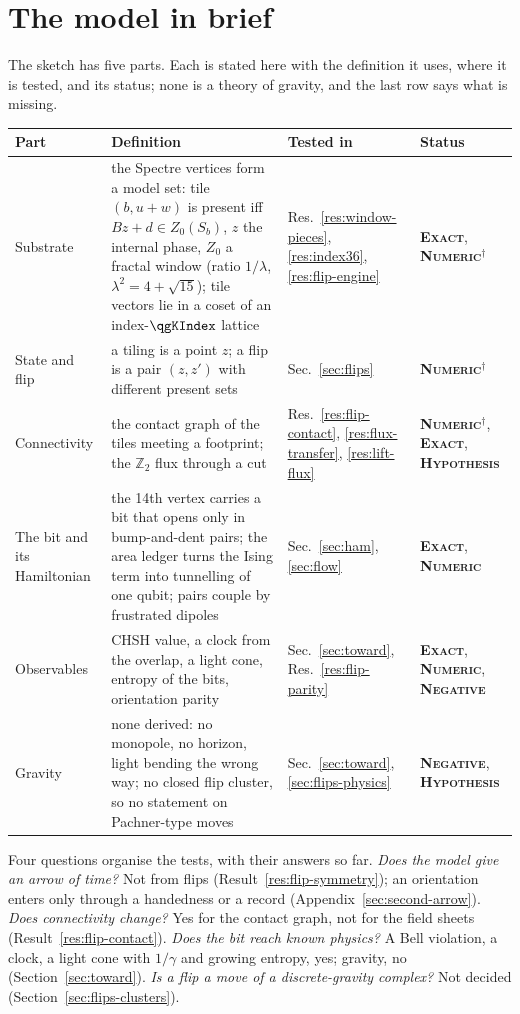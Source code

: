 \documentclass[11pt]{article}
\newcommand{\exact}{\textbf{\textsc{Exact}}}
\newcommand{\numeric}{\textbf{\textsc{Numeric}}}
\newcommand{\hypo}{\textbf{\textsc{Hypothesis}}}
\newcommand{\negres}{\textbf{\textsc{Negative}}}
\theoremstyle{definition}
\begin{document}
\section{The model in brief}\label{sec:model}
The sketch has five parts. Each is stated here with the definition it uses, where it is tested, and its status; none is a theory of gravity, and the last row says what is missing.
\begin{center}\footnotesize
\begin{tabular}{@{}p{22mm}p{62mm}p{22mm}p{28mm}@{}}
\toprule
Part & Definition & Tested in & Status \\ \midrule
Substrate & the Spectre vertices form a model set: tile $(b,u+w)$ is present iff $B z+d\in Z_0(S_b)$, $z$ the internal phase, $Z_0$ a fractal window (ratio $1/\lambda$, $\lambda^2=4+\sqrt{15}$); tile vectors lie in a coset of an index-$\qgKIndex$ lattice & Res.~\ref{res:window-pieces}, \ref{res:index36}, \ref{res:flip-engine} & \exact, \numeric$^\dagger$ \\
State and flip & a tiling is a point $z$; a flip is a pair $(z,z')$ with different present sets & Sec.~\ref{sec:flips} & \numeric$^\dagger$ \\
Connectivity & the contact graph of the tiles meeting a footprint; the $\mathbb{Z}_2$ flux through a cut & Res.~\ref{res:flip-contact}, \ref{res:flux-transfer}, \ref{res:lift-flux} & \numeric$^\dagger$, \exact, \hypo \\
The bit and its Hamiltonian & the 14th vertex carries a bit that opens only in bump-and-dent pairs; the area ledger turns the Ising term into tunnelling of one qubit; pairs couple by frustrated dipoles & Sec.~\ref{sec:ham}, \ref{sec:flow} & \exact, \numeric \\
Observables & CHSH value, a clock from the overlap, a light cone, entropy of the bits, orientation parity & Sec.~\ref{sec:toward}, Res.~\ref{res:flip-parity} & \exact, \numeric, \negres \\
Gravity & none derived: no monopole, no horizon, light bending the wrong way; no closed flip cluster, so no statement on Pachner-type moves & Sec.~\ref{sec:toward}, \ref{sec:flips-physics} & \negres, \hypo \\
\bottomrule
\end{tabular}
\end{center}
Four questions organise the tests, with their answers so far. \emph{Does the model give an arrow of time?} Not from flips (Result~\ref{res:flip-symmetry}); an orientation enters only through a handedness or a record (Appendix~\ref{sec:second-arrow}). \emph{Does connectivity change?} Yes for the contact graph, not for the field sheets (Result~\ref{res:flip-contact}). \emph{Does the bit reach known physics?} A Bell violation, a clock, a light cone with $1/\gamma$ and growing entropy, yes; gravity, no (Section~\ref{sec:toward}). \emph{Is a flip a move of a discrete-gravity complex?} Not decided (Section~\ref{sec:flips-clusters}).
\end{document}
